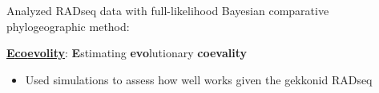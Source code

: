 \begin{frame}

    Analyzed RADseq data with full-likelihood Bayesian comparative phylogeographic method:

    \begin{center}
        \LARGE
        \href{https://github.com/phyletica/ecoevolity}{
            \textbf{\textcolor{pgreen}{E}\textcolor{pteal}{co\textcolor{pauburn}{evo}lity}}}:
        \textcolor{pgreen}{\bf E}stimating \textcolor{pauburn}{\bf evo}lutionary \textcolor{pteal}{\bf coevality}
    \end{center}


    \begin{itemize}
        \item<2-> Used simulations to assess how well \ecoevolity works given
            the gekkonid RADseq \datasets
    \end{itemize}
\end{frame}
